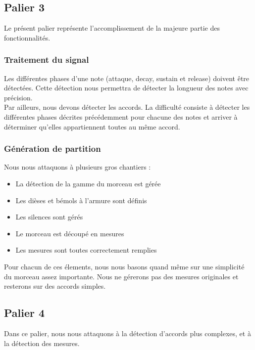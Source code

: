 \documentclass[12pt]{article}
\begin{document}
\newpage
\subsection{Palier 3}

Le présent palier représente l’accomplissement de la majeure partie des fonctionnalités.\\

\subsubsection{Traitement du signal}

Les différentes phases d’une note (attaque, decay, sustain et release) doivent être détectées. Cette détection nous permettra de détecter la longueur des notes avec précision.\\

Par ailleurs, nous devons détecter les accords. La difficulté consiste à détecter les différentes phases décrites précédemment pour chacune des notes et arriver à déterminer qu'elles appartiennent toutes au même accord.

\subsubsection{Génération de partition}

Nous nous attaquons à plusieurs gros chantiers :

\begin{itemize}
\item La détection de la gamme du morceau est gérée
\item Les dièses et bémols à l’armure sont définis
\item Les silences sont gérés
\item Le morceau est découpé en mesures
\item Les mesures sont toutes correctement remplies\\
\end{itemize}

Pour chacun de ces élements, nous nous basons quand même sur une simplicité du morceau assez importante. Nous ne gérerons pas des mesures originales et resterons sur des accords simples.

\newpage
\subsection{Palier 4}

Dans ce palier, nous nous attaquons à la détection d'accords plus complexes, et à la détection des mesures.\\
\end{document}
